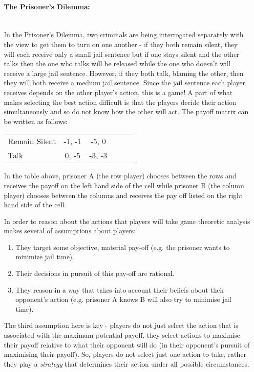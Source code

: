 \documentclass[12pt]{article}
\newcommand*{\np}{\par\noindent\newline}
\begin{document}
\paragraph{The Prisoner's Dilemma:}\mbox{}\\
In the Prisoner's Dilemma, two criminals are being interrogated
separately with the view to get them to turn on one another - if they both
remain silent, they will each receive only a small jail sentence but if one
stays silent and the other talks then the one who talks will be released while
the one who doesn't will receive a large jail sentence. However, if they both
talk, blaming the other, then they will both receive a medium jail sentence.
Since the jail sentence each player receives depends on the other player's
action, this is a game! A part of what makes selecting the best action
difficult is that the players decide their action simultaneously and so do not
know how the other will act. The payoff matrix can be written as follows:
\begin{center}
   \begin{tabular}{|l||*{5}{c|}}\hline
	\backslashbox{Prisoner A}{Prisoner B}
	&\makebox[7em]{Remain Silent}&\makebox[7em]{Talk}\\\hline\hline
	Remain Silent & -1, -1 & -5, 0\\\hline
	Talk & 0, -5 & -3, -3 \\\hline
	\end{tabular}
\end{center}
In the table above, prisoner A (the row player) chooses between the rows and
receives the payoff on the left hand side of the cell while prisoner B (the
column player) chooses between the columns and receives the pay off listed on
the right hand side of the cell.
\np In order to reason about the actions that players will take game theoretic
analysis makes several of assumptions about players:
\begin{enumerate}
    \item They target some objective, material pay-off (e.g. the prisoner wants
    to minimize jail time).
    \item Their decisions in pursuit of this pay-off are rational.
    \item They reason in a way that takes into account their beliefs about
    their opponent's action (e.g. prisoner A knows B will also try to minimise
    jail time). 
\end{enumerate}
\cite{osborne_course_1994}
\np The third assumption here is key - players do not just select the action
that is associated with the maximum potential payoff, they select actions to
maximise their payoff relative to what their opponent will do (in their
opponent's pursuit of maximising their payoff). So, players do not select just
one action to take, rather they play a \textit{strategy} that determines their
action under all possible circumstances.
\end{document}
